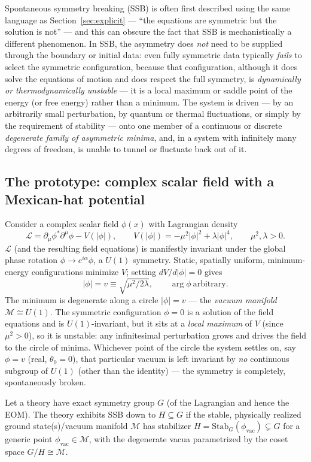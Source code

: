 Spontaneous symmetry breaking (SSB) is often first described using the same
language as Section~\ref{sec:explicit} — ``the equations are symmetric but the
solution is not'' — and this can obscure the fact that SSB is mechanistically a
different phenomenon. In SSB, the asymmetry does \emph{not} need to be supplied
through the boundary or initial data: even fully symmetric data typically
\emph{fails} to select the symmetric configuration, because that configuration,
although it does solve the equations of motion and does respect the full
symmetry, is \emph{dynamically or thermodynamically unstable} — it is a local
maximum or saddle point of the energy (or free energy) rather than a minimum.
The system is driven — by an arbitrarily small perturbation, by quantum or
thermal fluctuations, or simply by the requirement of stability — onto one
member of a continuous or discrete \emph{degenerate family of asymmetric
minima}, and, in a system with infinitely many degrees of freedom, is unable to
tunnel or fluctuate back out of it.

\subsection{The prototype: complex scalar field with a Mexican-hat potential}

Consider a complex scalar field $\phi(x)$ with Lagrangian density
\[
\mathcal{L} = \partial_\mu\phi^*\partial^\mu\phi - V(|\phi|), \qquad
V(|\phi|) = -\mu^2|\phi|^2 + \lambda|\phi|^4, \qquad \mu^2,\lambda>0 .
\]
$\mathcal{L}$ (and the resulting field equations) is manifestly invariant under the
global phase rotation $\phi\to e^{i\alpha}\phi$, a $U(1)$ symmetry. Static,
spatially uniform, minimum-energy configurations minimize $V$; setting 
$dV/d|\phi|=0$ gives
\[
|\phi| = v \equiv \sqrt{\mu^2/2\lambda}, \qquad \arg\phi \ \text{arbitrary}.
\]
The minimum is degenerate along a circle $|\phi|=v$ — the \emph{vacuum
manifold} $\mathcal M \cong U(1)$. The symmetric configuration $\phi=0$ is a
solution of the field equations and is $U(1)$-invariant, but it sits at a
\emph{local maximum} of $V$ (since $\mu^2>0$), so it is unstable: any
infinitesimal perturbation grows and drives the field to the circle of minima.
Whichever point of the circle the system settles on, say $\phi = v$ (real,
$\theta_0=0$), that particular vacuum is left invariant by \emph{no} continuous
subgroup of $U(1)$ (other than the identity) — the symmetry is completely,
spontaneously broken.

\begin{definition}
Let a theory have exact symmetry group $G$ (of the Lagrangian and hence the
    EOM). The theory exhibits SSB down to $H\subseteq G$ if the stable,
    physically realized ground state(s)/vacuum manifold $\mathcal M$ has
    stabilizer $H = \mathrm{Stab}_G(\phi_{\text{vac}}) \subsetneq G$ for a generic
    point $\phi_{\text{vac}}\in\mathcal M$, with the degenerate vacua
    parametrized by the coset space $G/H \cong \mathcal M$.
\end{definition}

